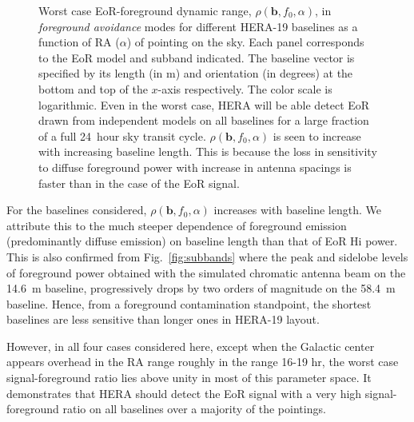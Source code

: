 \documentclass[preprint2,iop,numberedappendix,twocolappendix,appendixfloats]{emulateapj}
\begin{document}
\begin{figure}[htb]
  \caption{Worst case EoR-foreground dynamic range, $\rho(\boldsymbol{b},f_0,\alpha)$, in {\it foreground avoidance} modes for different HERA-19 baselines as a function of RA ($\alpha$) of pointing on the sky. Each panel corresponds to the EoR model and subband indicated. The baseline vector is specified by its length (in m) and orientation (in degrees) at the bottom and top of the $x$-axis respectively. The color scale is logarithmic. Even in the worst case, HERA will be able detect EoR drawn from independent models on all baselines for a large fraction of a full 24~hour sky transit cycle. $\rho(\boldsymbol{b},f_0,\alpha)$ is seen to increase with increasing baseline length. This is because the loss in sensitivity to diffuse foreground power with increase in antenna spacings is faster than in the case of the EoR signal.}
  \label{fig:eor-fg-ratios}
\end{figure}

For the baselines considered, $\rho(\boldsymbol{b},f_0,\alpha)$ increases with baseline length. We attribute this to the much steeper dependence of foreground emission (predominantly diffuse emission) on baseline length than that of EoR H{\sc i} power. This is also confirmed from Fig.~\ref{fig:subbands} where the peak and sidelobe levels of foreground power obtained with the simulated chromatic antenna beam on the 14.6~m baseline, progressively drops by two orders of magnitude on the 58.4~m baseline. Hence, from a foreground contamination standpoint, the shortest baselines are less sensitive than longer ones in HERA-19 layout.

However, in all four cases considered here, except when the Galactic center appears overhead in the RA range roughly in the range 16-19 hr, the worst case signal-foreground ratio lies above unity in most of this parameter space. It demonstrates that HERA should detect the EoR signal with a very high signal-foreground ratio on all baselines over a majority of the pointings. 
\end{document}
